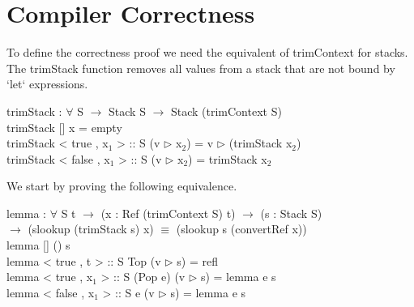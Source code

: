\documentclass[paper=a4, fontsize=11pt]{scrartcl} %
\numberwithin{equation}{section} %
\numberwithin{figure}{section} %
\numberwithin{table}{section} %
\begin{document}
\section{Compiler Correctness}
To define the correctness proof we need the equivalent of \ttfamily trimContext \normalfont for stacks. The \ttfamily trimStack \normalfont function removes all values from a stack that are not bound by `let` expressions.\\
\ttfamily

trimStack : $\forall$ {S} $\rightarrow$ Stack S $\rightarrow$ Stack (trimContext S)\\
trimStack {[]} x = empty\\
trimStack {< true , x$_1$ > :: S} (v $\rhd$ x$_2$) = v $\rhd$ (trimStack x$_2$)\\
trimStack {< false , x$_1$ > :: S} (v $\rhd$ x$_2$) = trimStack x$_2$\\

\normalfont

We start by proving the following equivalence.\\
\ttfamily

lemma : $\forall$ {S t} $\rightarrow$ (x : Ref (trimContext S) t) $\rightarrow$ (s : Stack S)\\
\hspace*{30mm}$\rightarrow$ (slookup (trimStack s) x) $\equiv$ (slookup s (convertRef x))\\

lemma {[]} () s\\
lemma {< true , t > :: S} Top (v $\rhd$ s) = refl\\
lemma {< true , x$_1$ > :: S} (Pop e) (v $\rhd$ s) = lemma e s\\
lemma {< false , x$_1$ > :: S} e (v $\rhd$ s) = lemma e s\\
\end{document}

